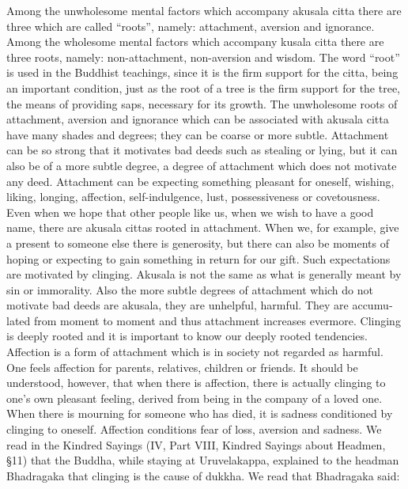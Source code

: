 \documentclass{book}
\begin{document}
Among the unwholesome mental factors which accom­pany akusala citta
there are three which are called ``roots'', namely: attachment, aversion
and ignorance. Among the wholesome mental factors which accompany kusala
citta there are three roots, namely: non-attachment, non-aversion and
wisdom. The word ``root'' is used in the Buddhist teachings, since it is
the firm support for the citta, being an important condition, just as
the root of a tree is the firm support for the tree, the means of
providing saps, necessary for its growth. The unwholesome roots of
attachment, aversion and ignorance which can be associated with akusala
citta have many shades and degrees; they can be coarse or more subtle.
Attachment can be so strong that it motivates bad deeds such as stealing
or lying, but it can also be of a more subtle degree, a degree of
attachment which does not motivate any deed. Attachment can be expecting
something pleasant for oneself, wishing, liking, longing, affection,
self-indulgence, lust, possessiveness or covetousness. Even when we hope
that other people like us, when we wish to have a good name, there are
akusala cittas rooted in attachment. When we, for example, give a
present to someone else there is generosity, but there can also be
moments of hoping or expecting to gain something in return for our gift.
Such expectations are motivated by clinging. Akusala is not the same as
what is generally meant by sin or immorality. Also the more subtle
degrees of attachment which do not motivate bad deeds are akusala, they
are unhelpful, harmful. They are accumu­lated from moment to moment and
thus attachment increases evermore. Clinging is deeply rooted and it is
important to know our deeply rooted tendencies. Affection is a form of
attachment which is in society not regarded as harmful. One feels
affection for parents, relatives, children or friends. It should be
understood, however, that when there is affection, there is actually
clinging to one's own pleasant feeling, derived from being in the
company of a loved one. When there is mourning for someone who has died,
it is sadness conditioned by clinging to oneself. Affection
conditions fear of loss, aversion and sadness. We read in the Kindred
Sayings (IV, Part VIII, Kindred Sayings about Headmen, §11) that the
Buddha, while staying at Uruvelakappa, explained to the headman
Bhadragaka that clinging is the cause of dukkha. We read that Bhadragaka
said:
\end{document}
